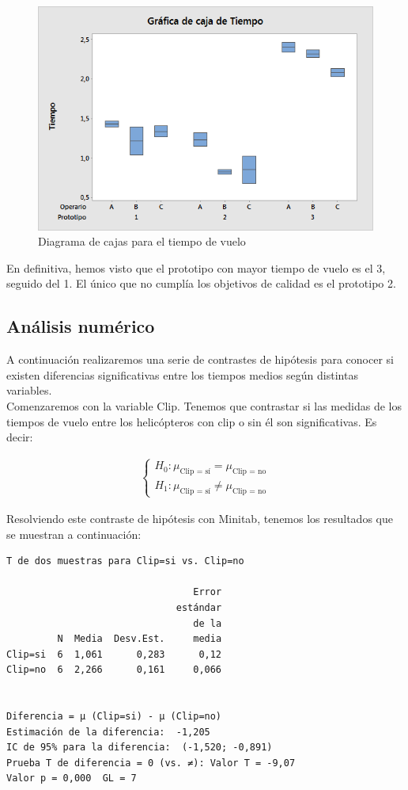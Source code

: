\documentclass[12pt,a4paper,twoside,openright,titlepage,final]{article}
\begin{document}
\begin{figure}[htbp!]
	\centering
	\includegraphics[width=0.7\linewidth]{imagenes/Grafica_de_caja_de_Tiempo}
	\caption{Diagrama de cajas para el tiempo de vuelo}
	\label{fig:diagrama_cajas}
\end{figure}

En definitiva, hemos visto que el prototipo con mayor tiempo de vuelo es el 3, seguido del 1. El único que no cumplía los objetivos de calidad es el prototipo 2.

\subsection{Análisis numérico}

A continuación realizaremos una serie de contrastes de hipótesis para conocer si existen diferencias significativas entre los tiempos medios según distintas variables.\\

Comenzaremos con la variable Clip. Tenemos que contrastar si las medidas de los tiempos de vuelo entre los helicópteros con clip o sin él son significativas. Es decir:

\begin{eqnarray*}
\begin{cases}
	H_0: \mu_{\text{Clip = sí}} = \mu_{\text{Clip = no}} \\
	H_1: \mu_{\text{Clip = sí}} \neq \mu_{\text{Clip = no}}
\end{cases}
\end{eqnarray*}

Resolviendo este contraste de hipótesis con Minitab, tenemos los resultados que se muestran a continuación:

\begin{verbatim}
T de dos muestras para Clip=si vs. Clip=no

                                 Error
                              estándar
                                 de la
         N  Media  Desv.Est.     media
Clip=si  6  1,061      0,283      0,12
Clip=no  6  2,266      0,161     0,066


Diferencia = μ (Clip=si) - μ (Clip=no)
Estimación de la diferencia:  -1,205
IC de 95% para la diferencia:  (-1,520; -0,891)
Prueba T de diferencia = 0 (vs. ≠): Valor T = -9,07                               Valor p = 0,000  GL = 7
\end{verbatim}
\end{document}
